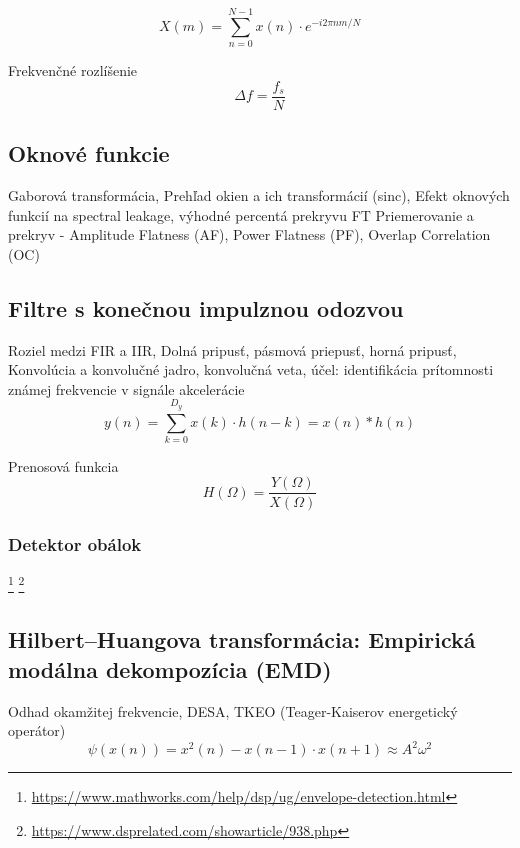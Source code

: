 \begin{equation}
X(m) = \sum_{n = 0}^{N-1}{x(n) \cdot e^{-i2\pi n m / N}}
\end{equation}

Frekvenčné rozlíšenie
\begin{equation}
\Delta f = \frac{f_s}{N}
\end{equation}

\subsection{Oknové funkcie}
Gaborová transformácia, Prehľad okien a ich transformácií (sinc), Efekt oknových funkcií na spectral leakage, výhodné percentá prekryvu FT 	\cite{understanding-dsp} \cite{spectral-density-estimation}
Priemerovanie a prekryv - Amplitude Flatness (AF), Power Flatness (PF), Overlap Correlation (OC)

\subsection{Filtre s konečnou impulznou odozvou}
Roziel medzi FIR a IIR, Dolná pripusť, pásmová priepusť, horná pripusť,
 Konvolúcia a konvolučné jadro, konvolučná veta, účel: identifikácia prítomnosti známej frekvencie v signále akcelerácie
\begin{equation}
y(n) = \sum_{k=0}^{D_y}{x(k) \cdot h(n-k)} = x(n) * h(n)
\end{equation}

Prenosová funkcia
\begin{equation}
H(\Omega) = \frac{Y(\Omega)}{X(\Omega)}
\end{equation}	

\subsubsection{Detektor obálok}
\footnote{\url{https://www.mathworks.com/help/dsp/ug/envelope-detection.html}}
\footnote{\url{https://www.dsprelated.com/showarticle/938.php}}

\subsection{Hilbert–Huangova transformácia: Empirická modálna dekompozícia (EMD)}
Odhad okamžitej frekvencie, DESA, TKEO (Teager-Kaiserov energetický operátor) \cite{eeg-spanok} 
\begin{equation}
\psi(x(n)) = x^2(n) - x(n-1) \cdot x(n+1) \approx A^2\omega^2
\end{equation}
	
\emptypage 
